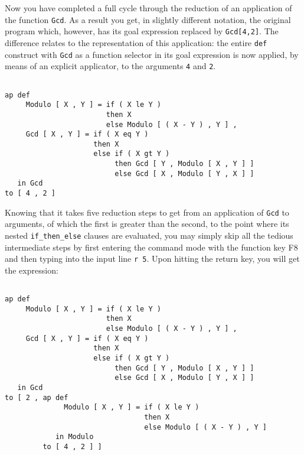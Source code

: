 Now you have completed a full cycle through the reduction
of an application of the function {\tt Gcd}.
As a result you get, in slightly different notation, the original
program which, however, has its goal expression 
replaced by {\tt Gcd[4,2]}. The difference relates to the representation of this application: the entire {\tt def} construct with {\tt Gcd} as 
a function
selector in its goal expression is now applied, by means of an explicit
applicator, to the arguments {\tt 4} and {\tt 2}.  
\begin{verbatim}

ap def 
     Modulo [ X , Y ] = if ( X le Y )
                        then X
                        else Modulo [ ( X - Y ) , Y ] ,
     Gcd [ X , Y ] = if ( X eq Y )
                     then X
                     else if ( X gt Y )
                          then Gcd [ Y , Modulo [ X , Y ] ]
                          else Gcd [ X , Modulo [ Y , X ] ]
   in Gcd
to [ 4 , 2 ]

\end{verbatim}
Knowing that it takes five reduction steps to get from an application of
{\tt Gcd} to arguments, of which the first is greater than the second, to
the point where its nested {\tt if\_then\_else} clauses are evaluated,
you may simply skip all the tedious intermediate steps by first entering the
command mode with the function key F8 and then typing into the input line
{\tt r 5}. Upon hitting the return key, you will get the expression: 
\begin{verbatim}

ap def 
     Modulo [ X , Y ] = if ( X le Y )
                        then X
                        else Modulo [ ( X - Y ) , Y ] ,
     Gcd [ X , Y ] = if ( X eq Y )
                     then X
                     else if ( X gt Y )
                          then Gcd [ Y , Modulo [ X , Y ] ]
                          else Gcd [ X , Modulo [ Y , X ] ]
   in Gcd
to [ 2 , ap def 
              Modulo [ X , Y ] = if ( X le Y )
                                 then X
                                 else Modulo [ ( X - Y ) , Y ]
            in Modulo
         to [ 4 , 2 ] ]

\end{verbatim}

